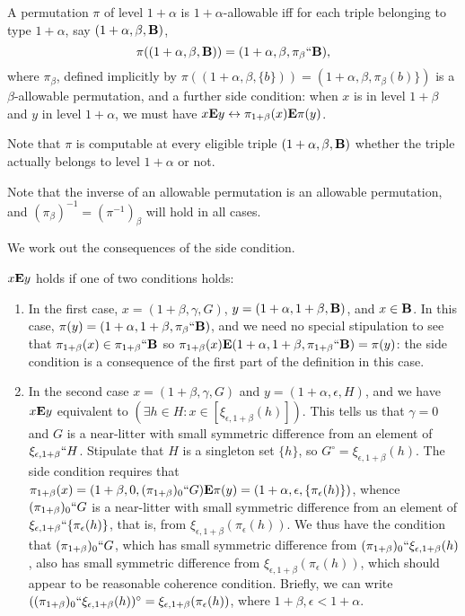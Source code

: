 \documentclass[12pt]{article}
\begin{document}
A permutation $\pi$ of level $1+\alpha$ is $1+\alpha$-allowable iff for each triple belonging to type $1+\alpha$, say $(1+\alpha,\beta,{\bf B})$, $$\pi((1+\alpha,\beta,{\bf B})) = (1+\alpha,\beta,\pi_{\beta}``{\bf B}),$$ where $\pi_\beta$, defined implicitly by $\pi((1+\alpha,\beta,\{b\})) = (1+\alpha,\beta,\pi_\beta(b)\})$ is a $\beta$-allowable permutation, and a further side condition:  when $x$ is in level $1+\beta$ and $y$ in level $1+\alpha$, we must have $x {\bf E} y \leftrightarrow \pi_{1+\beta}(x) {\bf E} \pi(y)$.

Note that $\pi$ is computable at every eligible triple $(1+\alpha,\beta,{\bf B})$ whether the triple actually belongs to level $1+\alpha$ or not.

Note that the inverse of an allowable permutation is an allowable permutation, and $(\pi_{\beta})^{-1} = (\pi^{-1})_\beta$ will hold in all cases.

We work out the consequences of the side condition.

$x {\bf E} y$ holds if one of two conditions holds:

\begin{enumerate}

\item  In the first case, $x=(1+\beta,\gamma,G)$, $y = (1+\alpha,1+\beta,{\bf B})$, and $x \in {\bf B}$.  In this case, $\pi(y) = (1+\alpha,1+\beta,\pi_\beta``{\bf B})$,
and we need no special stipulation to see that $\pi_{1+\beta}(x) \in \pi_{1+\beta}``{\bf B}$ so $\pi_{1+\beta}(x) {\bf E}  (1+\alpha,1+\beta,\pi_{1+\beta}``{\bf B}) = \pi(y)$:  the side condition is a consequence of the first part of the definition in this case.

\item  In the second case $x=(1+\beta,\gamma,G)$ and $y=(1+\alpha,\epsilon,H)$, and we have $x {\bf E} y$ equivalent to $(\exists h \in H:x \in [\xi_{\epsilon,1+\beta}(h)])$.
This tells us that $\gamma=0$ and $G$ is a near-litter with small symmetric difference from an element of $\xi_{\epsilon,1+\beta}``H$.  Stipulate that $H$ is a singleton set
$\{h\}$, so $G^{\circ} = \xi_{\epsilon,1+\beta}(h)$.   The side condition requires that $\pi_{1+\beta}(x) = (1+\beta,0,(\pi_{1+\beta})_0``G) {\bf E} \pi(y) = (1+\alpha,\epsilon,\{\pi_\epsilon(h)\})$, whence
$(\pi_{1+\beta})_0``G$ is a near-litter with small symmetric difference from an element of $\xi_{\epsilon,1+\beta}``\{\pi_\epsilon(h)\}$, that is, from $\xi_{\epsilon,1+\beta}(\pi_\epsilon(h))$.   We thus have the condition that  $(\pi_{1+\beta})_0``G$, which has small symmetric difference from $(\pi_{1+\beta})_0``\xi_{\epsilon,1+\beta}(h)$, also  has small symmetric difference from  $\xi_{\epsilon,1+\beta}(\pi_\epsilon(h))$, which should appear to be reasonable coherence condition.  Briefly, we can write  $((\pi_{1+\beta})_0``\xi_{\epsilon,1+\beta}(h))^{\circ}=\xi_{\epsilon,1+\beta}(\pi_\epsilon(h))$, where $1+\beta, \epsilon <1+\alpha$.

\end{enumerate}
\end{document}
